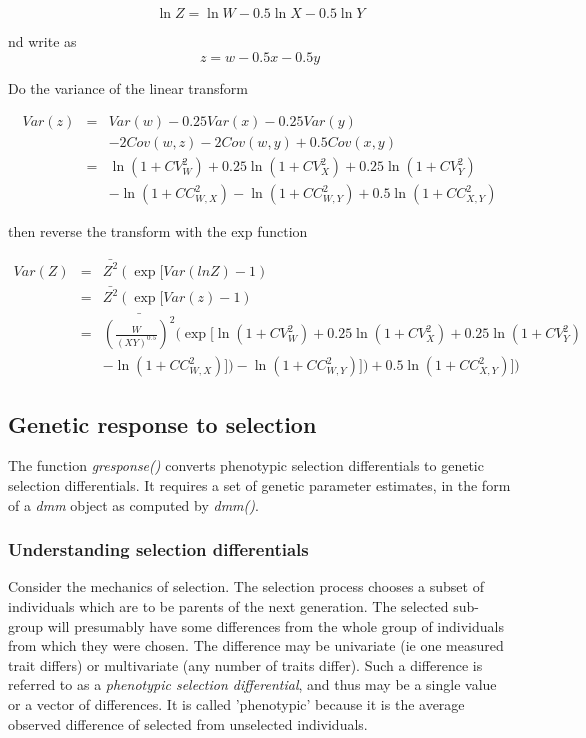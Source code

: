 \documentclass[titlepage]{article}  %
\begin{document}
\begin{displaymath}
\ln Z = \ln W - 0.5 \ln X - 0.5 \ln Y
\end{displaymath}

nd write as
\begin{displaymath}
z = w - 0.5 x - 0.5 y
\end{displaymath}


Do the variance of the linear transform

\begin{eqnarray*}
Var(z) & = & Var(w) - 0.25 Var(x) - 0.25 Var(y) \\
       &   &  - 2 Cov(w,z) - 2 Cov(w,y) + 0.5 Cov(x,y) \\
       & = & \ln(1 + CV^{2}_{W}) + 0.25 \ln(1 + CV^{2}_{X}) + 0.25 \ln(1 + CV^{2}_{Y}) \\
       &   &  - \ln(1 + CC^{2}_{W,X}) - \ln(1 + CC^{2}_{W,Y}) + 0.5 \ln(1 + CC^{2}_{X,Y}) 
\end{eqnarray*}

then reverse the transform with the exp function

\begin{eqnarray*}
Var(Z) & = & \bar{Z^{2}}(\exp[Var(lnZ) - 1) \\
       & = & \bar{Z^{2}}(\exp[Var(z) - 1) \\
       & = & \bar{(\frac{W}{(XY)^{0.5}})^{2}}(\exp[\ln(1+CV^{2}_{W}) + 0.25 \ln(1 + CV^{2}_{X}) + 0.25 \ln(1 + CV^{2}_{Y}) \\
       &   &  - \ln(1 + CC^{2}_{W,X})]) - \ln(1 + CC^{2}_{W,Y})]) + 0.5 \ln(1 + CC^{2}_{X,Y})])
\end{eqnarray*}




\clearpage
\subsection{Genetic response to selection}

The function {\em gresponse()} converts phenotypic selection differentials to genetic selection differentials. It requires a set of genetic parameter estimates, in the form of a {\em dmm} object as computed by {\em dmm()}.

\subsubsection{Understanding selection differentials}
 Consider the mechanics of selection. The selection process chooses a subset of individuals which are to be parents of the next generation. The selected sub-group will presumably have some differences from the whole group of individuals from which they were chosen. The difference may be univariate (ie one measured trait differs) or multivariate (any number of traits differ). Such a difference is referred to as a {\em phenotypic selection differential}, and thus may be a single value or a vector of differences. It is called 'phenotypic' because it is the average observed difference of selected from unselected individuals.
\end{document}
